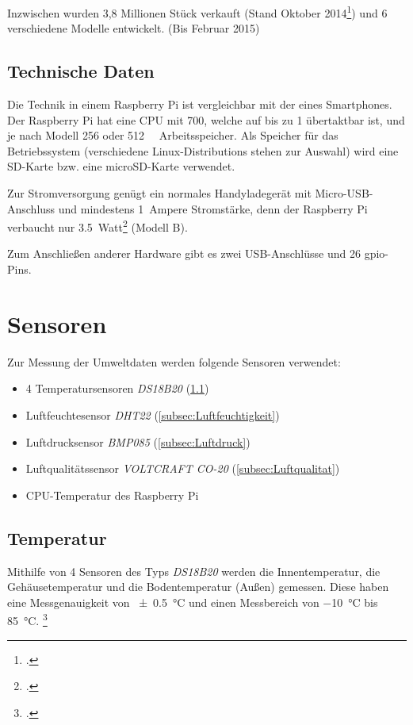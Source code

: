 Inzwischen wurden 3,8 Millionen Stück verkauft (Stand Oktober 2014\footcite{verkauf}) und 6 verschiedene Modelle entwickelt. (Bis Februar 2015)

\subsection{Technische Daten}
\label{subsec:Technische Daten}
Die Technik in einem Raspberry Pi ist vergleichbar mit der eines Smartphones. Der Raspberry Pi hat eine \gls{CPU} mit \SI{700}{}, welche auf bis zu \SI{1}{} übertaktbar ist, und je nach Modell \SI{256}{} oder \SI{512}{\mega\byte} Arbeitsspeicher. Als Speicher für das Betriebssystem (verschiedene \glspl{Linux-Distribution} stehen zur Auswahl) wird eine SD-Karte bzw. eine microSD-Karte verwendet.

Zur Stromversorgung genügt ein normales Handyladegerät mit Micro-USB-Anschluss und mindestens \SI{1}{\gls{Ampere}} Stromstärke, denn der Raspberry Pi verbaucht nur \SI{3.5}{Watt}\footcite{strom} (Modell B).

Zum Anschließen anderer Hardware gibt es zwei USB-Anschlüsse und 26 \gls{gpio}-Pins.

\section{Sensoren}
\label{sec:Sensoren}

Zur Messung der Umweltdaten werden folgende Sensoren verwendet:
\begin{itemize}
\item 4 Temperatursensoren \emph{DS18B20} (\ref{subsec:Temperatur})
\item Luftfeuchtesensor \emph{DHT22} (\ref{subsec:Luftfeuchtigkeit})
\item Luftdrucksensor \emph{BMP085} (\ref{subsec:Luftdruck})
\item Luftqualitätssensor \emph{VOLTCRAFT CO-20} (\ref{subsec:Luftqualitat})
\item\gls{CPU}-Temperatur des Raspberry Pi
\end{itemize}
\subsection{Temperatur}
\label{subsec:Temperatur}

Mithilfe von 4 Sensoren des Typs \emph{DS18B20} werden die Innentemperatur, die Gehäusetemperatur und die Bodentemperatur (Außen) gemessen. Diese haben eine Messgenauigkeit von \SI{\pm 0.5}{\degreeCelsius}  und einen Messbereich von \SI{-10}{\degreeCelsius}  bis \SI{+85}{\degreeCelsius}. \footcite[20]{temp}

